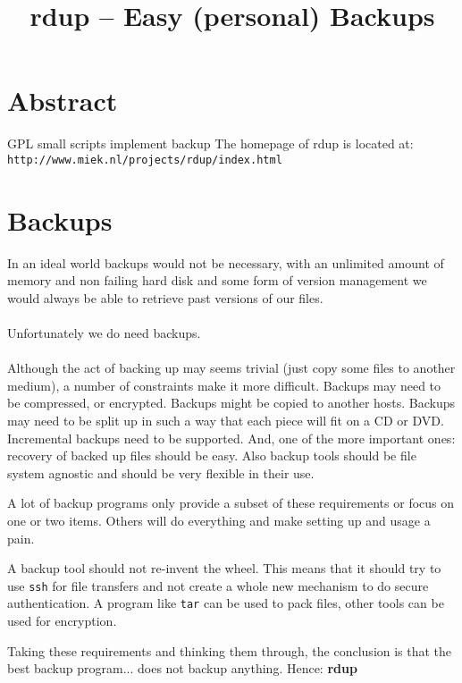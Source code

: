 \documentclass{article}
\newcommand{\rdup}{\textbf{rdup}}
\newcommand{\cmd}[1]{\texttt{#1}}
\newcommand{\url}[1]{\texttt{#1}}
\begin{document}
\pagestyle{empty}

\title{\rdup{} -- Easy (personal) Backups}
\date{}
\maketitle

\section{Abstract}
GPL 
small
scripts implement backup 
The homepage of rdup is located at: 
\url{http://www.miek.nl/projects/rdup/index.html}



\section{Backups}
In an ideal world backups would not be necessary, with an unlimited
amount of memory and non failing hard disk and some form of version
management we would always be able to retrieve past versions of our files.
\paragraph{}
Unfortunately we do need backups.
\paragraph{}
Although the act of backing up may seems trivial (just copy some files
to another medium), a number of constraints make it more difficult. 
Backups may need to be compressed, or encrypted. Backups might be copied
to another hosts. Backups may need to be split up in such a way that
each piece will fit on a CD or DVD. Incremental backups need to be
supported. And, one of the more important ones: recovery of backed up
files should be easy.  Also backup tools should be file system agnostic
and should be very flexible in their use.

A lot of backup programs only provide a subset of these requirements or
focus on one or two items. Others will do everything and make setting up
and usage a pain.

A backup tool should not re-invent the wheel.  This means that it should
try to use \cmd{ssh} for file transfers and not create a whole new
mechanism to do secure authentication. A program like \cmd{tar} can be
used to pack files, other tools can be used for encryption. 

Taking these requirements and thinking them through, the
conclusion is that the best backup program... does not backup anything.
Hence: \rdup
\end{document}
